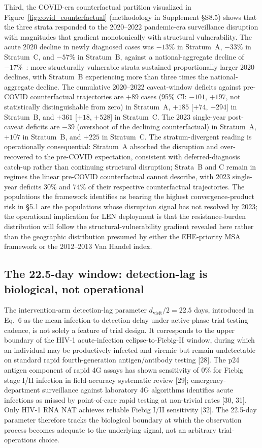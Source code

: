 \documentclass[12pt]{article}
\begin{document}
Third, the COVID-era counterfactual partition visualized in Figure~\ref{fig:covid_counterfactual} (methodology in Supplement §S8.5) shows that the three strata responded to the 2020--2022 pandemic-era surveillance disruption with magnitudes that gradient monotonically with structural vulnerability. The acute 2020 decline in newly diagnosed cases was $-13\%$ in Stratum~A, $-33\%$ in Stratum~C, and $-57\%$ in Stratum~B, against a national-aggregate decline of $-17\%$~\cite{dinenno2022}: more structurally vulnerable strata sustained proportionally larger 2020 declines, with Stratum~B experiencing more than three times the national-aggregate decline. The cumulative 2020--2022 caveat-window deficits against pre-COVID counterfactual trajectories are $+89$ cases (95\% CI: $-101$, $+197$, not statistically distinguishable from zero) in Stratum~A, $+185$ [$+74$, $+294$] in Stratum~B, and $+361$ [$+18$, $+528$] in Stratum~C. The 2023 single-year post-caveat deficits are $-39$ (overshoot of the declining counterfactual) in Stratum~A, $+107$ in Stratum~B, and $+225$ in Stratum~C. The stratum-divergent reading is operationally consequential: Stratum~A absorbed the disruption and over-recovered to the pre-COVID expectation, consistent with deferred-diagnosis catch-up rather than continuing structural disruption; Strata~B and C remain in regimes the linear pre-COVID counterfactual cannot describe, with 2023 single-year deficits 30\% and 74\% of their respective counterfactual trajectories. 
The populations the framework identifies as bearing the highest convergence-product risk in §5.1 are the populations whose disruption signal has not resolved by 2023; the operational implication for LEN deployment is that the resistance-burden distribution will follow the structural-vulnerability gradient revealed here rather than the geographic distribution presumed by either the EHE-priority MSA framework or the 2012--2013 Van Handel index.


\subsection{The 22.5-day window: detection-lag is biological, not operational}

The intervention-arm detection-lag parameter $d_{\mathrm{visit}}/2 = 22.5$ days, introduced in Eq.\ 6 as the mean infection-to-detection delay under active-phase trial testing cadence, is not solely a feature of trial design. It corresponds to the upper boundary of the HIV-1 acute-infection eclipse-to-Fiebig-II window, during which an individual may be productively infected and viremic but remain undetectable on standard rapid fourth-generation antigen/antibody testing [28]. The p24 antigen component of rapid 4G assays has shown sensitivity of 0\% for Fiebig stage I/II infection in field-accuracy systematic review [29]; emergency-department surveillance against laboratory 4G algorithms identifies acute infections as missed by point-of-care rapid testing at non-trivial rates [30, 31]. Only HIV-1 RNA NAT achieves reliable Fiebig I/II sensitivity [32]. The 22.5-day parameter therefore tracks the biological boundary at which the observation process becomes adequate to the underlying signal, not an arbitrary trial-operations choice.
\end{document}
